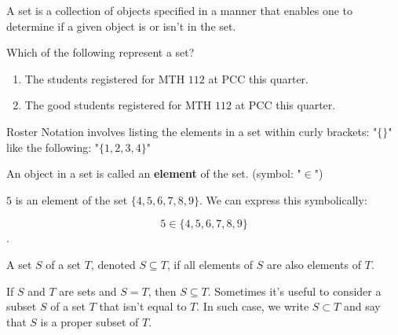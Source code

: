 
\begin{definition}[Set]
  \label{def:set}

  A set is a collection of objects specified in a manner that enables one to
  determine if a given object is or isn't in the set.
\end{definition}

\begin{exc}
  \label{exc:which_of_the_following_represent_a_set}

  Which of the following represent a set?
  
  \begin{enumerate}
    \label{enum:sets_and_numbers_example}

    \item The students registered for MTH $112$ at PCC this quarter.
    \item The good students registered for MTH $112$ at PCC this quarter.
  \end{enumerate}
\end{exc}

\begin{notation}
  Roster Notation involves listing the elements in a set within curly brackets:
  "$\{ \}$" like the following: "$\{ 1, 2, 3, 4 \}$"
\end{notation}

\begin{definition}[Element]
  \label{def:element}

  An object in a set is called an \textbf{element} of the set. (symbol: "$\in$")
\end{definition}

\begin{example}
  \label{exm:element}

  $5$ is an element of the set $\{ 4, 5, 6, 7, 8, 9 \}$. We can express this
  symbolically:

  \[ 5 \in \{ 4, 5, 6, 7, 8, 9 \} \].
\end{example}

\begin{definition}[Subset]
  \label{def:subset}

  A set $S$ of a set $T$, denoted $S \subseteq T$, if all elements of $S$ are
  also elements of $T$.

  If $S$ and $T$ are sets and $S = T$, then $S \subseteq T$. Sometimes it's
  useful to consider a subset $S$ of a set $T$ that isn't equal to $T$. In such
  case, we write $S \subset T$ and say that $S$ is a proper subset of $T$.
\end{definition}

